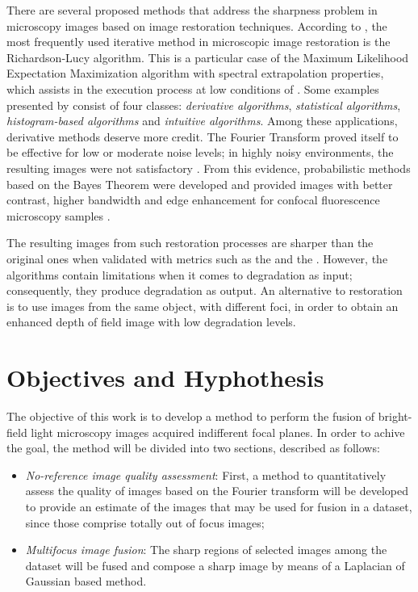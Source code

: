 There are several proposed methods that address the sharpness problem in microscopy images based on image restoration techniques. According to , the most frequently used iterative method in microscopic image restoration is the Richardson-Lucy algorithm. This is a particular case of the Maximum Likelihood Expectation Maximization algorithm with spectral extrapolation properties, which assists in the execution process at low conditions of . Some examples presented by \cite{sun2005autofocusing} consist of
four classes: \emph{derivative algorithms}, \emph{statistical algorithms}, \emph{histogram-based algorithms} and \emph{intuitive algorithms}. Among these applications, derivative methods deserve more credit. The Fourier Transform proved itself to be
effective for low or moderate noise levels; in highly noisy environments, the resulting images were not satisfactory \cite{richardson1972bayesian}. From this evidence, probabilistic methods based on the Bayes Theorem were developed and provided images with better contrast, higher bandwidth and
edge enhancement for confocal fluorescence microscopy samples \cite{ponti2016image}.

The resulting images from such restoration processes are sharper than the original ones when validated with metrics such as the  and the . However, the algorithms contain limitations when it comes to degradation as input; consequently, they produce degradation as output. An alternative to restoration is to use images from the same object, with different foci, in order to obtain an enhanced depth of field image with low degradation levels.

\section{Objectives and Hyphothesis}

The objective of this work is to develop a method to perform the fusion of bright-field light microscopy images acquired indifferent focal planes. In order to achive the goal, the method will be divided into two sections, described as follows:

\begin{itemize}
    \item \emph{No-reference image quality assessment}: First, a method to quantitatively assess the quality of images based on the Fourier transform will be developed to provide an estimate of the images that may be used for fusion in a dataset, since those comprise totally out of focus images;
    
    \item \emph{Multifocus image fusion}: The sharp regions of selected images among the dataset will be fused and compose a sharp image by means of a Laplacian of Gaussian based method.
    
\end{itemize}

